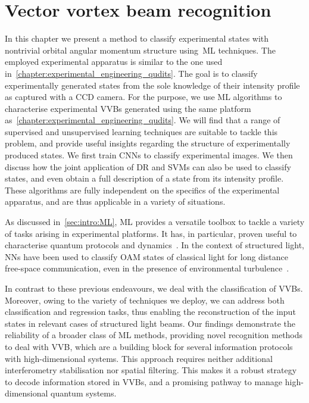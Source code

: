 
\chapter{Vector vortex beam recognition}
\label{chapter:ML_VVBs}

In this chapter we present a method to classify experimental states with nontrivial orbital angular momentum structure using~\acf{ML} techniques. The employed experimental apparatus is similar to the one used in~\cref{chapter:experimental_engineering_qudits}.
The goal is to classify experimentally generated states from the sole knowledge of their intensity profile as captured with a CCD camera.
For the purpose, we use \ac{ML} algorithms to characterise experimental \acfp{VVB} generated using the same platform as~\cref{chapter:experimental_engineering_qudits}.
We will find that a range of supervised and unsupervised learning techniques are suitable to tackle this problem, and provide useful insights regarding the structure of experimentally produced states.
We first train \acp{CNN} to classify experimental images.
We then discuss how the joint application of \ac{DR} and \acp{SVM} can also be used to classify states, and even obtain a full description of a state from its intensity profile.
These algorithms are fully independent on the specifics of the experimental apparatus, and are thus applicable in a variety of situations.

As discussed in~\cref{sec:intro:ML}, \ac{ML} provides a versatile toolbox to tackle a variety of tasks arising in experimental platforms. It has, in particular, proven useful to characterise quantum protocols and dynamics~\cite{carrasquilla2019reconstructing,giordani2018experimental, agresti2019pattern,lumino2018experimental,rocchetto2019experimental,butler2018machine,fischer2006predicting,melnikov2018active,wang2017experimental}.
In the context of structured light, \acfp{NN} have been used to classify \ac{OAM} states of classical light for long distance free-space communication, even in the presence of environmental turbulence~\cite{krenn2014communication,krenn2016twisted,doster2017machine,park2018demultiplexing,lohani2018turbulence,li2018joint}.

In contrast to these previous endeavours, we deal with the classification of \acp{VVB}. Moreover, owing to the variety of techniques we deploy, we can address both classification and regression tasks, thus enabling the reconstruction of the input states in relevant cases of structured light beams.
Our findings demonstrate the reliability of a broader class of ML methods, providing novel recognition methods to deal with \ac{VVB}, which are a building block for several information protocols with high-dimensional systems.
This approach requires neither additional interferometry stabilisation nor spatial filtering. This makes it a robust strategy to decode information stored in \acp{VVB}, and a promising pathway to manage high-dimensional quantum systems. 

